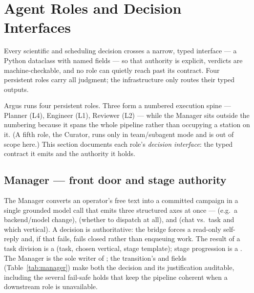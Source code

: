 \section{Agent Roles and Decision Interfaces}
\label{sec:roles}

\begin{designbox}
Every scientific and scheduling decision crosses a narrow, typed interface --- a
Python dataclass with named fields --- so that authority is explicit, verdicts are
machine-checkable, and no role can quietly reach past its contract. Four
persistent roles carry all judgment; the infrastructure only routes their typed
outputs.
\end{designbox}

Argus runs four persistent roles. Three form a numbered execution spine ---
Planner (L4), Engineer (L1), Reviewer (L2) --- while the Manager sits outside the
numbering because it spans the whole pipeline rather than occupying a station on
it. (A fifth role, the Curator, runs only in team/subagent mode and is out of
scope here.) This section documents each role's \emph{decision interface}: the
typed contract it emits and the authority it holds.

\subsection{Manager --- front door and stage authority}

The Manager converts an operator's free text into a committed campaign in a single
grounded model call that emits three structured axes at once ---
 (e.g.\ a backend/model change),  (whether to dispatch
at all), and  (chat vs.\ task and which vertical). A
 decision is authoritative: the bridge forces a
read-only self-reply and, if that fails, fails closed rather than enqueuing work.
The result of a task division is a  (task, chosen vertical, stage
template); stage progression is a . The Manager is the sole
writer of ; the transition's  and 
fields (Table~\ref{tab:manager}) make both the decision and its justification
auditable, including the several fail-safe holds that keep the pipeline coherent
when a downstream role is unavailable.


